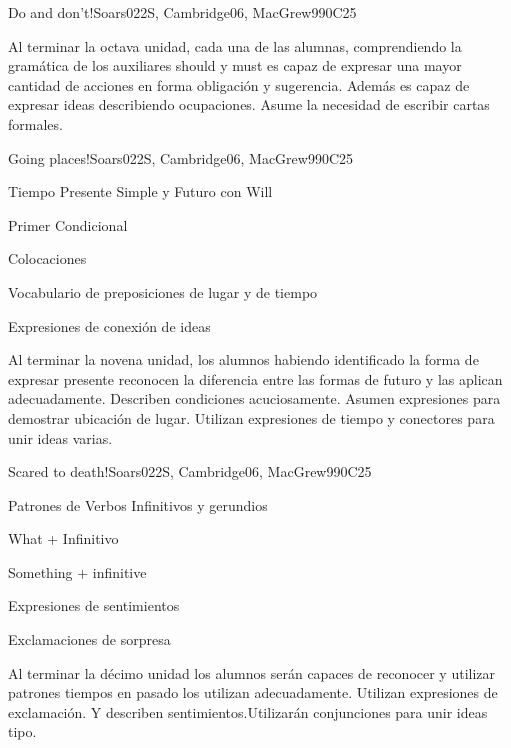 \begin{syllabus}
\begin{unit}{Do and don't!}{}{Soars022S, Cambridge06, MacGrew99}{0}{C25}
   \begin{learningoutcomes}
      \item Al terminar la octava unidad, cada una de las alumnas, comprendiendo la gramática de los auxiliares should y must  es capaz de expresar una mayor cantidad de acciones en forma obligación y sugerencia.  Además es capaz de expresar ideas describiendo ocupaciones.  Asume la necesidad de escribir cartas formales. 
   \end{learningoutcomes}
\end{unit}

\begin{unit}{Going places!}{}{Soars022S, Cambridge06, MacGrew99}{0}{C25}
   \begin{topics}
      \item Tiempo Presente Simple y Futuro con Will
      \item Primer Condicional
      \item Colocaciones
      \item Vocabulario de preposiciones de lugar y de tiempo
      \item Expresiones de conexión de ideas
   \end{topics}

   \begin{learningoutcomes}
      \item Al terminar la novena unidad, los alumnos habiendo identificado la forma de expresar presente reconocen la diferencia entre las formas de futuro y las aplican adecuadamente. Describen condiciones acuciosamente.  Asumen expresiones para demostrar ubicación de lugar. Utilizan expresiones de tiempo y conectores para unir ideas varias.
   \end{learningoutcomes}
\end{unit}

\begin{unit}{Scared to death!}{}{Soars022S, Cambridge06, MacGrew99}{0}{C25}
   \begin{topics}
      \item Patrones de Verbos Infinitivos y gerundios
      \item What + Infinitivo
      \item Something + infinitive
      \item Expresiones de sentimientos
      \item Exclamaciones de sorpresa 
   \end{topics}

   \begin{learningoutcomes}
      \item Al terminar la décimo unidad los alumnos serán capaces de reconocer y utilizar patrones tiempos en pasado los utilizan adecuadamente. Utilizan expresiones de exclamación. Y describen sentimientos.Utilizarán conjunciones para unir ideas tipo.
   \end{learningoutcomes}
\end{unit}


\end{syllabus}
